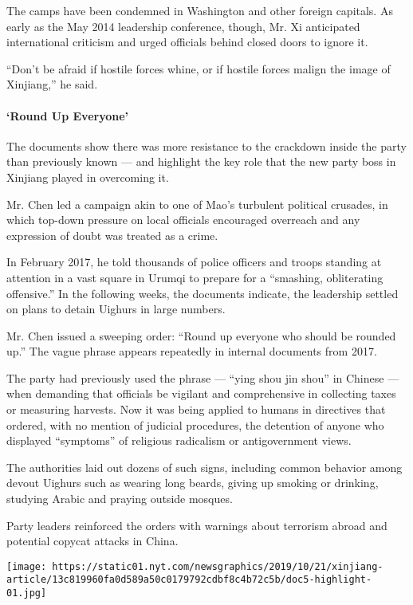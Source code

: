 The camps have been condemned in Washington and other foreign capitals.
As early as the May 2014 leadership conference, though, Mr. Xi
anticipated international criticism and urged officials behind closed
doors to ignore it.

``Don't be afraid if hostile forces whine, or if hostile forces malign
the image of Xinjiang,'' he said.

\hypertarget{-round-up-everyone-}{%
\paragraph{ `Round Up Everyone' }\label{-round-up-everyone-}}

The documents show there was more resistance to the crackdown inside the
party than previously known --- and highlight the key role that the new
party boss in Xinjiang played in overcoming it.

Mr. Chen led a campaign akin to one of Mao's turbulent political
crusades, in which top-down pressure on local officials encouraged
overreach and any expression of doubt was treated as a crime.

In February 2017, he told thousands of police officers and troops
standing at attention in a vast square in Urumqi to prepare for a
``smashing, obliterating offensive.'' In the following weeks, the
documents indicate, the leadership settled on plans to detain Uighurs in
large numbers.

Mr. Chen issued a sweeping order: ``Round up everyone who should be
rounded up.'' The vague phrase appears repeatedly in internal documents
from 2017.

The party had previously used the phrase --- ``ying shou jin shou'' in
Chinese --- when demanding that officials be vigilant and comprehensive
in collecting taxes or measuring harvests. Now it was being applied to
humans in directives that ordered, with no mention of judicial
procedures, the detention of anyone who displayed ``symptoms'' of
religious radicalism or antigovernment views.

The authorities laid out dozens of such signs, including common behavior
among devout Uighurs such as wearing long beards, giving up smoking or
drinking, studying Arabic and praying outside mosques.

Party leaders reinforced the orders with warnings about terrorism abroad
and potential copycat attacks in China.

\texttt{[image: https://static01.nyt.com/newsgraphics/2019/10/21/xinjiang-article/13c819960fa0d589a50c0179792cdbf8c4b72c5b/doc5-highlight-01.jpg]}

